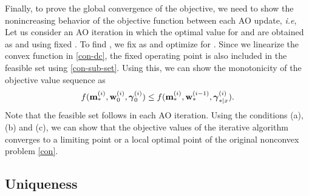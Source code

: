 Finally, to prove the global convergence of the objective, we need to show the nonincreasing behavior of the objective function between each \ac{AO} update, \textit{i.e}, 
Let us consider an \ac{AO} iteration  in which the optimal value for \eqn{\mx} and \eqn{\mz} are obtained as  and  using fixed . To find , we fix \eqn{\mx} as  and optimize for \me{\my}. Since we linearize the convex function in \eqref{con-dc}, the fixed operating point is also included in the feasible set  using \eqref{con-sub-set}. Using this, we can show the monotonicity of the objective value sequence as
\begin{equation*}
f({\mathbf{m}}_{\ast}^{(i)},{\mathbf{w}}_{0}^{(i)},{{\boldsymbol{\gamma}}}_{0}^{(i)}) \leq f({\mathbf{m}}_{\ast}^{(i)},{\mathbf{w}}_{\ast}^{(i-1)},{{\boldsymbol{\gamma}}}_{\ast|x}^{(i)}).
\end{equation*}
Note that the feasible set follows  in each \ac{AO} iteration. Using the conditions (a),(b) and (c), we can show that the objective values of the iterative algorithm converges to a limiting point or a local optimal point of the original nonconvex problem \eqref{con}.

\subsection{Uniqueness}

